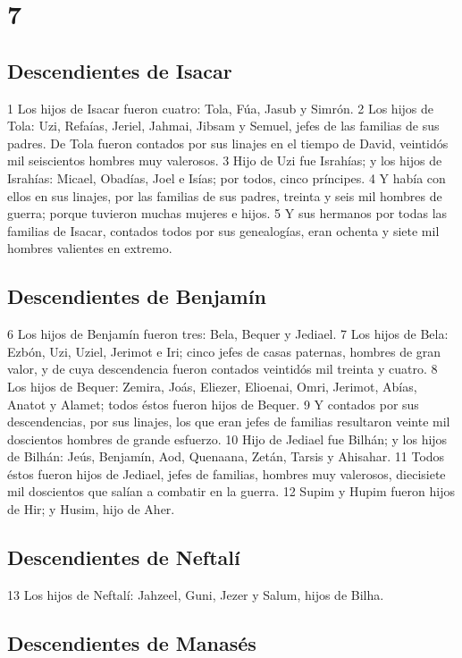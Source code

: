 \chapter{7}

\section*{Descendientes de Isacar}


1 Los hijos de Isacar fueron cuatro: Tola, Fúa, Jasub y Simrón.
2 Los hijos de Tola: Uzi, Refaías, Jeriel, Jahmai, Jibsam y Semuel, jefes de las familias de sus padres. De Tola fueron contados por sus linajes en el tiempo de David, veintidós mil seiscientos hombres muy valerosos.
3 Hijo de Uzi fue Israhías; y los hijos de Israhías: Micael, Obadías, Joel e Isías; por todos, cinco príncipes.
4 Y había con ellos en sus linajes, por las familias de sus padres, treinta y seis mil hombres de guerra; porque tuvieron muchas mujeres e hijos.
5 Y sus hermanos por todas las familias de Isacar, contados todos por sus genealogías, eran ochenta y siete mil hombres valientes en extremo.
\section*{Descendientes de Benjamín}

6 Los hijos de Benjamín fueron tres: Bela, Bequer y Jediael.
7 Los hijos de Bela: Ezbón, Uzi, Uziel, Jerimot e Iri; cinco jefes de casas paternas, hombres de gran valor, y de cuya descendencia fueron contados veintidós mil treinta y cuatro.
8 Los hijos de Bequer: Zemira, Joás, Eliezer, Elioenai, Omri, Jerimot, Abías, Anatot y Alamet; todos éstos fueron hijos de Bequer.
9 Y contados por sus descendencias, por sus linajes, los que eran jefes de familias resultaron veinte mil doscientos hombres de grande esfuerzo.
10 Hijo de Jediael fue Bilhán; y los hijos de Bilhán: Jeús, Benjamín, Aod, Quenaana, Zetán, Tarsis y Ahisahar.
11 Todos éstos fueron hijos de Jediael, jefes de familias, hombres muy valerosos, diecisiete mil doscientos que salían a combatir en la guerra.
12 Supim y Hupim fueron hijos de Hir; y Husim, hijo de Aher.
\section*{Descendientes de Neftalí}

13 Los hijos de Neftalí: Jahzeel, Guni, Jezer y Salum, hijos de Bilha.
\section*{Descendientes de Manasés}

